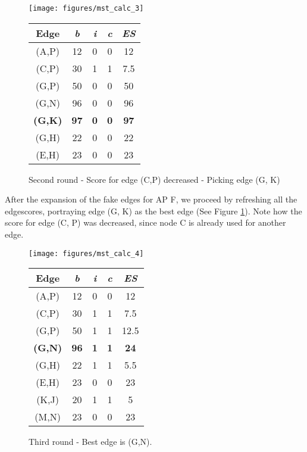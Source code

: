 	\begin{figure}[h!]
	  \centering
	  \begin{minipage}{7.5cm}
	    \texttt{[image: figures/mst\_calc\_3]}
	  \end{minipage}
	  \begin{minipage}{4cm}
	    \begin{tabular}{c||c|c|c||c}
	      Edge & \textit{b} & \textit{i} & \textit{c} & \textit{ES}\\ \hline\hline
	      (A,P) & 12 & 0 & 0 & 12 \\ \hline
	      (C,P) & 30 & 1 & 1 & 7.5 \\ \hline
	      (G,P) & 50 & 0 & 0 & 50 \\ \hline
	      (G,N) & 96 & 0 & 0 & 96 \\ \hline
	      \textbf{(G,K)} & \textbf{97} & \textbf{0} & \textbf{0} & \textbf{97} \\ \hline
	      (G,H) & 22 & 0 & 0 & 22 \\ \hline
	      (E,H) & 23 & 0 & 0 & 23 \\ \hline
	    \end{tabular}
	  \end{minipage}
	\caption{Second round - Score for edge (C,P) decreased - Picking edge (G, K)}
	\label{fig:mst_calc_3}
      \end{figure}

      After the expansion of the fake edges for \ac{AP} F, we proceed by refreshing all the edgescores, portraying edge (G, K) as the best edge (See Figure \ref{fig:mst_calc_3}).
      Note how the score for edge (C, P) was decreased, since node C is already used for another edge.
      
      \begin{figure}[h!]
	\centering
	\begin{minipage}{7.5cm}
	  \texttt{[image: figures/mst\_calc\_4]}
	\end{minipage}
	\begin{minipage}{4cm}
	  \begin{tabular}{c||c|c|c||c}
	    Edge & \textit{b} & \textit{i} & \textit{c} & \textit{ES}\\ \hline\hline
	    (A,P) & 12 & 0 & 0 & 12 \\ \hline
	    (C,P) & 30 & 1 & 1 & 7.5 \\ \hline
	    (G,P) & 50 & 1 & 1 & 12.5 \\ \hline
	    \textbf{(G,N)} & \textbf{96} & \textbf{1} & \textbf{1} & \textbf{24} \\ \hline
	    (G,H) & 22 & 1 & 1 & 5.5 \\ \hline
	    (E,H) & 23 & 0 & 0 & 23 \\ \hline
	    (K,J) & 20 & 1 & 1 & 5 \\ \hline
	    (M,N) & 23 & 0 & 0 & 23 \\ \hline
	  \end{tabular}
	\end{minipage}
	\caption{Third round - Best edge is (G,N).}
	\label{fig:mst_calc_4}
      \end{figure}
      
